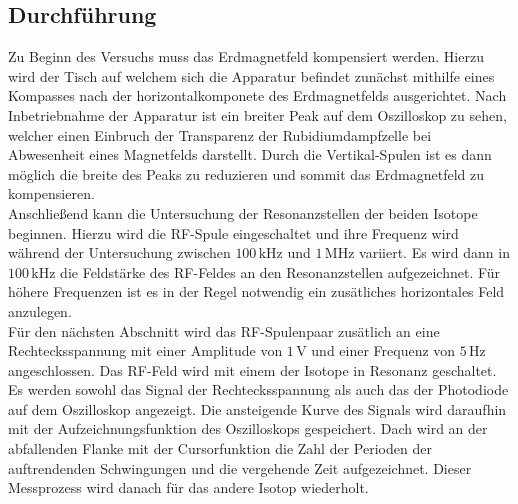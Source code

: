 \subsection{Durchführung}
Zu Beginn des Versuchs muss das Erdmagnetfeld kompensiert werden. Hierzu wird der Tisch auf welchem sich die Apparatur befindet zunächst mithilfe eines Kompasses nach der horizontalkomponete des Erdmagnetfelds ausgerichtet. Nach Inbetriebnahme der Apparatur ist ein breiter Peak auf dem Oszilloskop zu sehen, welcher einen Einbruch der Transparenz der Rubidiumdampfzelle bei Abwesenheit eines Magnetfelds darstellt. Durch die Vertikal-Spulen ist es dann möglich die breite des Peaks zu reduzieren und sommit das Erdmagnetfeld zu kompensieren.\\
Anschließend kann die Untersuchung der Resonanzstellen der beiden Isotope beginnen. Hierzu wird die RF-Spule eingeschaltet und ihre Frequenz wird während der Untersuchung zwischen $100\, \si{\kilo\hertz}$ und $1\,\si{\mega\hertz}$ variiert. Es wird dann in $100\, \si{\kilo\hertz}$ die Feldstärke des RF-Feldes an den Resonanzstellen aufgezeichnet. Für höhere Frequenzen ist es in der Regel notwendig ein zusätliches horizontales Feld anzulegen.\\
Für den nächsten Abschnitt wird das RF-Spulenpaar zusätlich an eine Rechtecksspannung mit einer Amplitude von $1\,\si{\volt}$ und einer Frequenz von $5\,\si{\hertz}$ angeschlossen. Das RF-Feld wird mit einem der Isotope in Resonanz geschaltet. Es werden sowohl das Signal der Rechtecksspannung als auch das der Photodiode auf dem Oszilloskop angezeigt. Die ansteigende Kurve des Signals wird daraufhin mit der Aufzeichnungsfunktion des Oszilloskops gespeichert. Dach wird an der abfallenden Flanke mit der Cursorfunktion die Zahl der Perioden der auftrendenden Schwingungen und die vergehende Zeit aufgezeichnet. Dieser Messprozess wird danach für das andere Isotop wiederholt.
